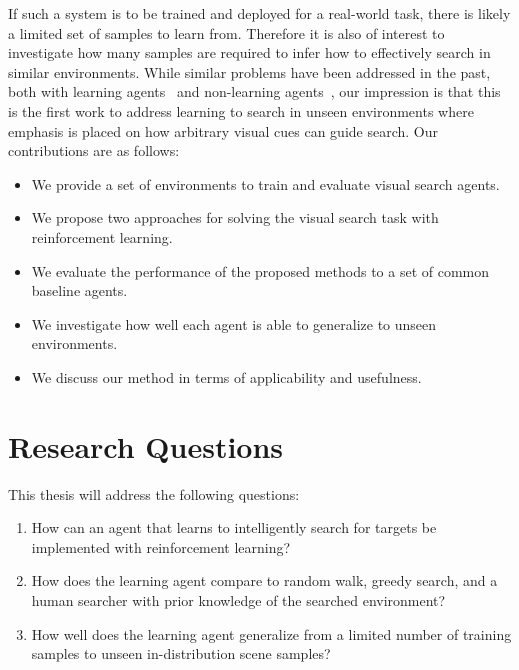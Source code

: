 If such a system is to be trained and deployed for a real-world task, there is likely a limited set of samples to learn from.
Therefore it is also of interest to investigate how many samples are required to infer how to effectively search in similar environments.
While similar problems have been addressed in the past, both with learning agents~\cite{minut_mahadevan_2001,mirowski_navigate_2017,ghesu_artificial_2016,caicedo_active_2015} and non-learning agents~\cite{shubina_visualsearch_2010,forssen_visual_2008}, 
our impression is that this is the first work to address learning to search in unseen environments where emphasis is placed on how arbitrary visual cues can guide search.
Our contributions are as follows:

\begin{itemize}
  \item We provide a set of environments to train and evaluate visual search agents.
  \item We propose two approaches for solving the visual search task with reinforcement learning.
  \item We evaluate the performance of the proposed methods to a set of common baseline agents.
  \item We investigate how well each agent is able to generalize to unseen environments.
  \item We discuss our method in terms of applicability and usefulness.
\end{itemize}

\section{Research Questions}
\label{sec:questions}

This thesis will address the following questions:

\begin{enumerate}
  \item \label{itm:rq1} How can an agent that learns to intelligently search for targets be implemented with reinforcement learning?
  \item \label{itm:rq2} How does the learning agent compare to random walk, greedy search, and a human searcher with prior knowledge of the searched environment?
  \item \label{itm:rq3} How well does the learning agent generalize from a limited number of training samples to unseen in-distribution scene samples?
\end{enumerate}

